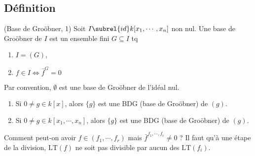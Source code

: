         \subsection{Définition}
            \begin{defi} (Base de Groöbner, 1)
                Soit $I \subrel{id} k[x_1, \cdots, x_n]$ non nul. Une base de Groöbner de $I$ est un ensemble fini $G \subseteq I$ tq
                \begin{enumerate}
                    \item $I = (G)$,
                    \item $f \in I \iff \bar f^G = 0$
                \end{enumerate}
            \end{defi}
            Par convention, $\emptyset$ est une base de Groöbner de l'idéal nul.
            \begin{expl}
                \begin{enumerate}
                    \item Si $0 \neq g \in k[x]$, alors $\{g\}$ est une BDG (base de Groöbner) de $(g)$.
                    \item Si $0 \neq g \in k[x_1, \cdots, x_n]$, alors $\{g\}$ est une BDG (base de Groöbner) de $(g)$.
                \end{enumerate}
            \end{expl}
            Comment peut-on avoir $f \in (f_1, \cdots, f_r)$ mais $\bar f^{f_1, \cdots, f_r} \neq 0$ ? Il faut qu'à une étape de la division, $\mathrm{LT}(f)$ ne soit pas divisible par aucun des $\mathrm{LT}(f_i)$. 
        
